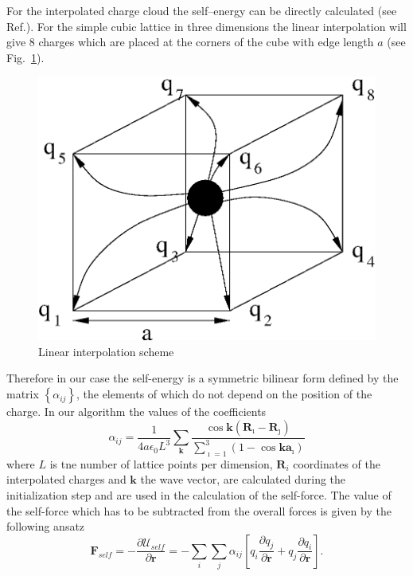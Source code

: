 \documentclass[a4paper, 12pt]{article}
\newcommand{\vect}[1]{\mathbf{#1}}
\begin{document}
\begin{enumerate}
For the interpolated charge cloud the self--energy can be directly
calculated (see Ref.\cite{phd_pasichnyk}). For the simple cubic
lattice in three dimensions the linear interpolation will give 8
charges which are placed at the corners of the cube with edge length
$a$ (see Fig.~\ref{fig:charge_assig_cubic_lattice}).
%
\begin{figure} 
  \centering \includegraphics[scale=0.55]{figs/charge_assig_cube.eps}
  \caption{Linear interpolation scheme} 
  \label{fig:charge_assig_cubic_lattice}  
\end{figure}
%
Therefore in our case the self-energy is a symmetric bilinear form
defined by the matrix $\left\{\alpha_{ij}\right\}$, the elements of
which do not depend on the position of the charge. In our algorithm
the values of the coefficients
%
\begin{equation}
  \alpha_{ij}=\frac{1}{4a\epsilon_0L^3}\sum\limits_{\vect k}\frac{\cos \vect k(\vect R_{\imath}-\vect R_{\jmath})}{\sum_{\imath=1}^3(1-\cos\vect
      k\vect a_{\imath})}
\end{equation}
%
where $L$ is tne number of lattice points per dimension, $\vect R_i$ coordinates of the interpolated charges and $\vect k$ the wave vector, are calculated during the initialization step and are used in the
calculation of the self-force. The value of the self-force which has
to be subtracted from the overall forces is given by the following
ansatz
%
\begin{equation}
  \vect F_{self}=-\frac{\partial \mathcal U_{self}}{\partial\vect
    r}=-\sum\limits_i\sum\limits_j\alpha_{ij}\left[q_i\frac{\partial
      q_j}{\partial\vect r}+q_j\frac{\partial q_i}{\partial\vect r}\right].
\end{equation}
%
%

\end{enumerate}
\end{document}
